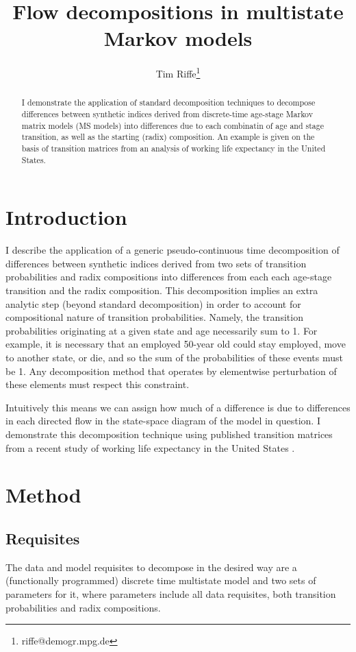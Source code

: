 \documentclass{article}
\begin{document}
\title{Flow decompositions in multistate Markov models}
\author[1]{Tim Riffe\thanks{riffe@demogr.mpg.de}}
\maketitle

\begin{abstract}
I demonstrate the application of standard decomposition techniques to decompose differences between synthetic indices derived from discrete-time age-stage Markov matrix models (MS models) into differences due to each combinatin of age and stage transition, as well as the starting (radix) composition. An example is given on the basis of transition matrices from an analysis of working life expectancy in the United States.
\end{abstract}

\section{Introduction}
I describe the application of a generic pseudo-continuous time decomposition \citep{horiuchi2008} of differences between synthetic indices derived from two sets of transition probabilities and radix compositions into differences from each each age-stage transition and the radix composition. This decomposition implies an extra analytic step (beyond standard decomposition) in order to account for compositional nature of transition probabilities. Namely, the transition probabilities originating at a
given state and age necessarily sum to 1. For example, it is necessary that an employed 50-year old could stay employed, move to another state, or die, and so the sum of the probabilities of these events must be 1. Any decomposition method that operates by elementwise perturbation of these elements must respect this constraint.

 Intuitively this means we can assign how much of a difference is due to differences in each directed flow in the state-space diagram of the model in question. I demonstrate this decomposition technique using published transition matrices from a recent study of working life expectancy in the United States \citep{Dudel2017}.

\section{Method}
\subsection{Requisites}
The data and model requisites to decompose in the desired way are a (functionally programmed) discrete time multistate model and two sets of parameters for it, where parameters include all data requisites, both transition probabilities and radix compositions.
\end{document}
